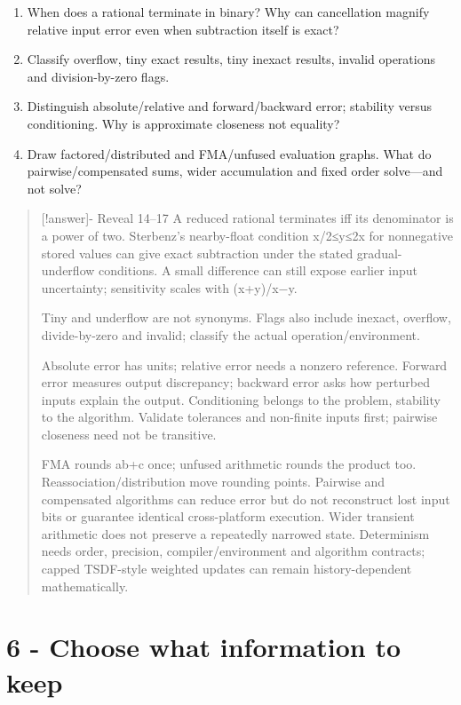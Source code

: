 \begin{enumerate}
\def\labelenumi{\arabic{enumi}.}
\setcounter{enumi}{13}
\tightlist
\item
  When does a rational terminate in binary? Why can cancellation magnify relative input error even when subtraction itself is exact?
\item
  Classify overflow, tiny exact results, tiny inexact results, invalid operations and division-by-zero flags.
\item
  Distinguish absolute/relative and forward/backward error; stability versus conditioning. Why is approximate closeness not equality?
\item
  Draw factored/distributed and FMA/unfused evaluation graphs. What do pairwise/compensated sums, wider accumulation and fixed order solve---and not solve?
\end{enumerate}

\begin{quote}
{[}!answer{]}- Reveal 14--17 A reduced rational terminates iff its denominator is a power of two. Sterbenz's nearby-float condition x/2≤y≤2x for nonnegative stored values can give exact subtraction under the stated gradual-underflow conditions. A small difference can still expose earlier input uncertainty; sensitivity scales with (\textbar x\textbar+\textbar y\textbar)/\textbar x−y\textbar.

Tiny and underflow are not synonyms. Flags also include inexact, overflow, divide-by-zero and invalid; classify the actual operation/environment.

Absolute error has units; relative error needs a nonzero reference. Forward error measures output discrepancy; backward error asks how perturbed inputs explain the output. Conditioning belongs to the problem, stability to the algorithm. Validate tolerances and non-finite inputs first; pairwise closeness need not be transitive.

FMA rounds ab+c once; unfused arithmetic rounds the product too. Reassociation/distribution move rounding points. Pairwise and compensated algorithms can reduce error but do not reconstruct lost input bits or guarantee identical cross-platform execution. Wider transient arithmetic does not preserve a repeatedly narrowed state. Determinism needs order, precision, compiler/environment and algorithm contracts; capped TSDF-style weighted updates can remain history-dependent mathematically.
\end{quote}

\section{6 - Choose what information to keep}\label{appendix-ef4d27797a92-choose-what-information-to-keep}

